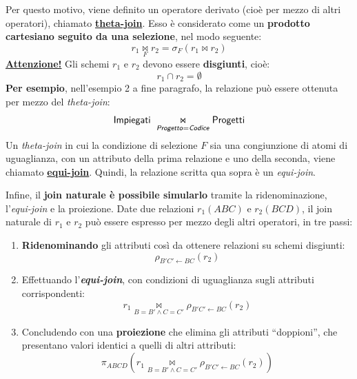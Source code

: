 \documentclass[a4paper]{article}
\newcommand{\dquotes}[1]{``#1''}
\begin{document}
	Per questo motivo, viene definito un operatore derivato (cioè per mezzo di altri operatori), chiamato \textcolor{Red3}{\textbf{\underline{theta-join}}}. Esso è considerato come un \textbf{prodotto cartesiano seguito da una selezione}, nel modo seguente:
	\begin{equation*}
		r_{1} \underset{F}{\Join} r_{2} = \sigma_{F}\left(r_{1} \Join r_{2}\right)
	\end{equation*}
	\textbf{\underline{Attenzione!}} Gli schemi $r_{1}$ e $r_{2}$ devono essere \textbf{disgiunti}, cioè:
	\begin{equation*}
		r_{1} \cap r_{2} = \emptyset
	\end{equation*}
	\textcolor{Green4}{\textbf{Per esempio}}, nell'esempio 2 a fine paragrafo, la relazione può essere ottenuta per mezzo del \emph{theta-join}:
	\begin{equation*}
		\textsf{Impiegati } \underset{\textsf{\emph{Progetto}} = \textsf{\emph{Codice}}}{\Join} \textsf{Progetti}
	\end{equation*}
	Un \emph{theta-join} in cui la condizione di selezione $F$ sia una congiunzione di atomi di uguaglianza, con un attributo della prima relazione e uno della seconda, viene chiamato \textcolor{Red3}{\textbf{\underline{equi-join}}}. Quindi, la relazione scritta qua sopra è un \emph{equi-join}.
	
	Infine, il \textbf{join naturale è possibile simularlo} tramite la ridenominazione, l'\emph{equi-join} e la proiezione. Date due relazioni $r_{1}\left(ABC\right)$ e $r_{2}\left(BCD\right)$, il join naturale di $r_{1}$ e $r_{2}$ può essere espresso per mezzo degli altri operatori, in tre passi:
	\begin{enumerate}
		\item \textbf{Ridenominando} gli attributi così da ottenere relazioni su schemi disgiunti:
		\begin{equation*}
			\rho_{B'C' \leftarrow BC} \left(r_{2}\right)
		\end{equation*}
		
		\item Effettuando l'\textbf{\emph{equi-join}}, con condizioni di uguaglianza sugli attributi corrispondenti:
		\begin{equation*}
			r_{1} \underset{B = B' \land C = C'}{\Join} \rho_{B'C' \leftarrow BC} \left(r_{2}\right)
		\end{equation*}
		
		\item Concludendo con una \textbf{proiezione} che elimina gli attributi \dquotes{doppioni}, che presentano valori identici a quelli di altri attributi:
		\begin{equation*}
			\pi_{ABCD}\left(r_{1} \underset{B = B' \land C = C'}{\Join} \rho_{B'C' \leftarrow BC} \left(r_{2}\right)\right)
		\end{equation*}
	\end{enumerate}\newpage
	
\end{document}
